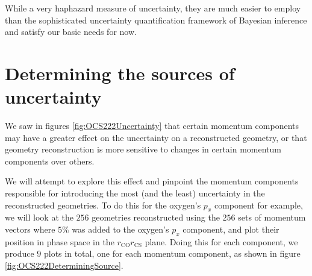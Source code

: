 While a very haphazard measure of uncertainty, they are much easier to employ than the sophisticated uncertainty quantification framework of Bayesian inference and satisfy our basic needs for now.



\section{Determining the sources of uncertainty} \label{sec:sourceUncertainty}
We saw in figures \ref{fig:OCS222Uncertainty} that certain momentum components may have a greater effect on the uncertainty on a reconstructed geometry, or that geometry reconstruction is more sensitive to changes in certain momentum components over others.

We will attempt to explore this effect and pinpoint the momentum components responsible for introducing the most (and the least) uncertainty in the reconstructed geometries. To do this for the oxygen's $p_x$ component for example, we will look at the $256$ geometries reconstructed using the $256$ sets of momentum vectors where $5\%$ was added to the oxygen's $p_x$ component, and plot their position in phase space in the $r_\mathrm{CO}r_\mathrm{CS}$ plane. Doing this for each component, we produce $9$ plots in total, one for each momentum component, as shown in figure \ref{fig:OCS222DeterminingSource}.

